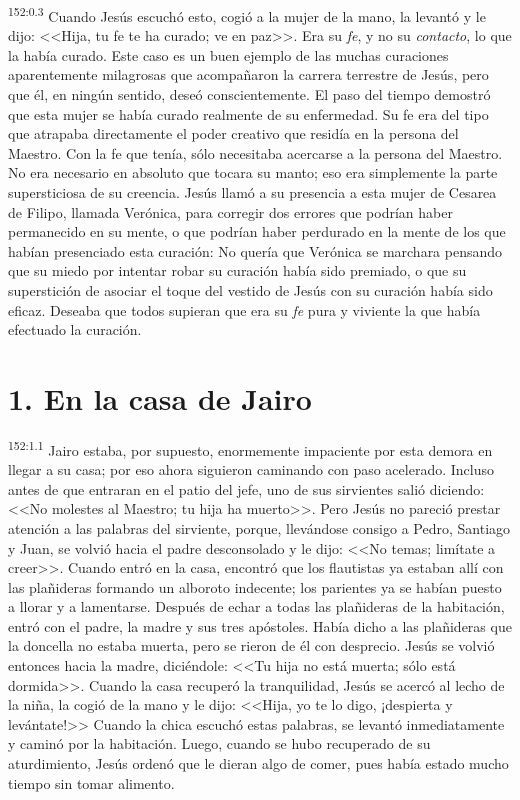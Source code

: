 \par 
\textsuperscript{152:0.3} Cuando Jesús escuchó esto, cogió a la mujer de la mano, la levantó y le dijo: <<Hija, tu fe te ha curado; ve en paz>>. Era su \textit{fe}, y no su \textit{contacto}, lo que la había curado. Este caso es un buen ejemplo de las muchas curaciones aparentemente milagrosas que acompañaron la carrera terrestre de Jesús, pero que él, en ningún sentido, deseó conscientemente. El paso del tiempo demostró que esta mujer se había curado realmente de su enfermedad. Su fe era del tipo que atrapaba directamente el poder creativo que residía en la persona del Maestro. Con la fe que tenía, sólo necesitaba acercarse a la persona del Maestro. No era necesario en absoluto que tocara su manto; eso era simplemente la parte supersticiosa de su creencia. Jesús llamó a su presencia a esta mujer de Cesarea de Filipo, llamada Verónica, para corregir dos errores que podrían haber permanecido en su mente, o que podrían haber perdurado en la mente de los que habían presenciado esta curación: No quería que Verónica se marchara pensando que su miedo por intentar robar su curación había sido premiado, o que su superstición de asociar el toque del vestido de Jesús con su curación había sido eficaz. Deseaba que todos supieran que era su \textit{fe} pura y viviente la que había efectuado la curación.

\section*{1. En la casa de Jairo}
\par 
\textsuperscript{152:1.1} Jairo estaba, por supuesto, enormemente impaciente por esta demora en llegar a su casa; por eso ahora siguieron caminando con paso acelerado. Incluso antes de que entraran en el patio del jefe, uno de sus sirvientes salió diciendo: <<No molestes al Maestro; tu hija ha muerto>>. Pero Jesús no pareció prestar atención a las palabras del sirviente, porque, llevándose consigo a Pedro, Santiago y Juan, se volvió hacia el padre desconsolado y le dijo: <<No temas; limítate a creer>>. Cuando entró en la casa, encontró que los flautistas ya estaban allí con las plañideras formando un alboroto indecente; los parientes ya se habían puesto a llorar y a lamentarse. Después de echar a todas las plañideras de la habitación, entró con el padre, la madre y sus tres apóstoles. Había dicho a las plañideras que la doncella no estaba muerta, pero se rieron de él con desprecio. Jesús se volvió entonces hacia la madre, diciéndole: <<Tu hija no está muerta; sólo está dormida>>. Cuando la casa recuperó la tranquilidad, Jesús se acercó al lecho de la niña, la cogió de la mano y le dijo: <<Hija, yo te lo digo, ¡despierta y levántate!>> Cuando la chica escuchó estas palabras, se levantó inmediatamente y caminó por la habitación. Luego, cuando se hubo recuperado de su aturdimiento, Jesús ordenó que le dieran algo de comer, pues había estado mucho tiempo sin tomar alimento.

